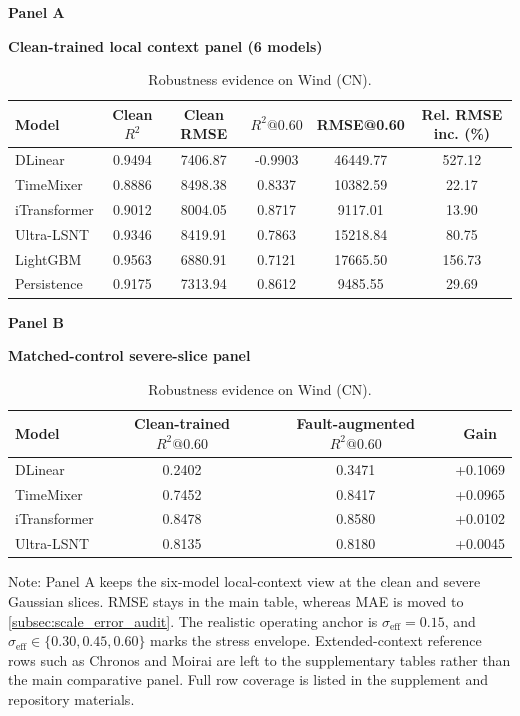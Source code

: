 \documentclass[review,1p,times]{elsarticle}
\newcommand{\aePanelHeading}[2]{%
  \par\vspace{2pt}%
  \noindent\begin{minipage}{\linewidth}
    \centering
    \textbf{#1}\par
    \textbf{#2}\par
  \end{minipage}%
  \par\vspace{2pt}%
}
\newcommand{\aeTableNote}[1]{%
  \par\vspace{2pt}%
  \noindent\begin{minipage}{\linewidth}
    \raggedright\footnotesize
    Note: #1
  \end{minipage}%
  \par
}
\begin{document}
\begin{table}[t]
\centering
\caption{Robustness evidence on Wind (CN).}
\label{tab:table2_comprehensive}
\label{tab:main4_perf_robust_context}
\label{tab:main_wind_cn}
\label{tab:master_robustness}
\footnotesize
\setlength{\tabcolsep}{4pt}
\aePanelHeading{Panel A}{Clean-trained local context panel (6 models)}
\begin{tabular*}{\linewidth}{@{\extracolsep{\fill}}lccccc@{}}
\toprule
\textbf{Model} & \textbf{Clean $R^2$} & \textbf{Clean RMSE} & \textbf{$R^2@0.60$} & \textbf{RMSE@0.60} & \textbf{Rel. RMSE inc. (\%)} \\
\midrule
DLinear & 0.9494 & 7406.87 & -0.9903 & 46449.77 & 527.12 \\
TimeMixer & 0.8886 & 8498.38 & 0.8337 & 10382.59 & 22.17 \\
iTransformer & 0.9012 & 8004.05 & 0.8717 & 9117.01 & 13.90 \\
Ultra-LSNT & 0.9346 & 8419.91 & 0.7863 & 15218.84 & 80.75 \\
LightGBM & 0.9563 & 6880.91 & 0.7121 & 17665.50 & 156.73 \\
Persistence & 0.9175 & 7313.94 & 0.8612 & 9485.55 & 29.69 \\
\bottomrule
\end{tabular*}
\vspace{4pt}
\aePanelHeading{Panel B}{Matched-control severe-slice panel}
\begin{tabular*}{0.92\linewidth}{@{\extracolsep{\fill}}lccc@{}}
\toprule
\textbf{Model} & \textbf{Clean-trained $R^2@0.60$} & \textbf{Fault-augmented $R^2@0.60$} & \textbf{Gain} \\
\midrule
DLinear & 0.2402 & 0.3471 & +0.1069 \\
TimeMixer & 0.7452 & 0.8417 & +0.0965 \\
iTransformer & 0.8478 & 0.8580 & +0.0102 \\
Ultra-LSNT & 0.8135 & 0.8180 & +0.0045 \\
\bottomrule
\end{tabular*}
\aeTableNote{Panel A keeps the six-model local-context view at the clean and severe Gaussian slices. RMSE stays in the main table, whereas MAE is moved to \ref{subsec:scale_error_audit}. The realistic operating anchor is $\sigma_{\mathrm{eff}}=0.15$, and $\sigma_{\mathrm{eff}}\in\{0.30,0.45,0.60\}$ marks the stress envelope. Extended-context reference rows such as Chronos and Moirai are left to the supplementary tables rather than the main comparative panel. Full row coverage is listed in the supplement and repository materials.}
\end{table}
\end{document}
